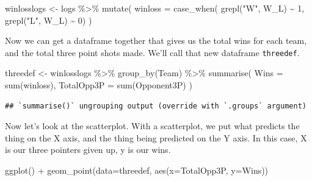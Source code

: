 \documentclass[
]{book}
\newenvironment{Shaded}{\begin{snugshade}}{\end{snugshade}}
\newcommand{\AttributeTok}[1]{\textcolor[rgb]{0.77,0.63,0.00}{#1}}
\newcommand{\DecValTok}[1]{\textcolor[rgb]{0.00,0.00,0.81}{#1}}
\newcommand{\FunctionTok}[1]{\textcolor[rgb]{0.00,0.00,0.00}{#1}}
\newcommand{\NormalTok}[1]{#1}
\newcommand{\OtherTok}[1]{\textcolor[rgb]{0.56,0.35,0.01}{#1}}
\newcommand{\SpecialCharTok}[1]{\textcolor[rgb]{0.00,0.00,0.00}{#1}}
\newcommand{\StringTok}[1]{\textcolor[rgb]{0.31,0.60,0.02}{#1}}
\begin{document}
\begin{Shaded}
\begin{Highlighting}[]
\NormalTok{winlosslogs }\OtherTok{\textless{}{-}}\NormalTok{ logs }\SpecialCharTok{\%\textgreater{}\%} 
  \FunctionTok{mutate}\NormalTok{(}
    \AttributeTok{winloss =} \FunctionTok{case\_when}\NormalTok{(}
      \FunctionTok{grepl}\NormalTok{(}\StringTok{"W"}\NormalTok{, W\_L) }\SpecialCharTok{\textasciitilde{}} \DecValTok{1}\NormalTok{, }
      \FunctionTok{grepl}\NormalTok{(}\StringTok{"L"}\NormalTok{, W\_L) }\SpecialCharTok{\textasciitilde{}} \DecValTok{0}\NormalTok{)}
\NormalTok{)}
\end{Highlighting}
\end{Shaded}

Now we can get a dataframe together that gives us the total wins for each team, and the total three point shots made. We'll call that new dataframe \texttt{threedef}.

\begin{Shaded}
\begin{Highlighting}[]
\NormalTok{threedef }\OtherTok{\textless{}{-}}\NormalTok{ winlosslogs }\SpecialCharTok{\%\textgreater{}\%} 
  \FunctionTok{group\_by}\NormalTok{(Team) }\SpecialCharTok{\%\textgreater{}\%} 
  \FunctionTok{summarise}\NormalTok{(}
    \AttributeTok{Wins =} \FunctionTok{sum}\NormalTok{(winloss), }
    \AttributeTok{TotalOpp3P =} \FunctionTok{sum}\NormalTok{(Opponent3P)}
\NormalTok{    )}
\end{Highlighting}
\end{Shaded}

\begin{verbatim}
## `summarise()` ungrouping output (override with `.groups` argument)
\end{verbatim}

Now let's look at the scatterplot. With a scatterplot, we put what predicts the thing on the X axis, and the thing being predicted on the Y axis. In this case, X is our three pointers given up, y is our wins.

\begin{Shaded}
\begin{Highlighting}[]
\FunctionTok{ggplot}\NormalTok{() }\SpecialCharTok{+} \FunctionTok{geom\_point}\NormalTok{(}\AttributeTok{data=}\NormalTok{threedef, }\FunctionTok{aes}\NormalTok{(}\AttributeTok{x=}\NormalTok{TotalOpp3P, }\AttributeTok{y=}\NormalTok{Wins))}
\end{Highlighting}
\end{Shaded}
\end{document}
